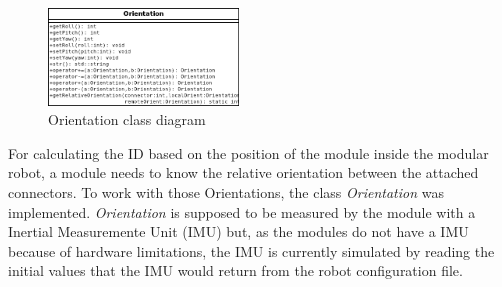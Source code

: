 \begin{figure}[h]
		\centering
        \includegraphics[width=0.45\textwidth]{images/Class_diagram_Orientation.png}
        \caption{Orientation class diagram}\label{fig:software_class_orientation_class}
\end{figure}

For calculating the ID based on the position of the module inside the modular robot, a module needs to know the relative orientation between the attached connectors. To work with those Orientations, the class \emph{Orientation} was implemented. \emph{Orientation} is supposed to be measured by the module with a Inertial Measuremente Unit (IMU) but, as the modules do not have a IMU because of hardware limitations, the IMU is currently simulated by reading the initial values that the IMU would return from the robot configuration file.\\

